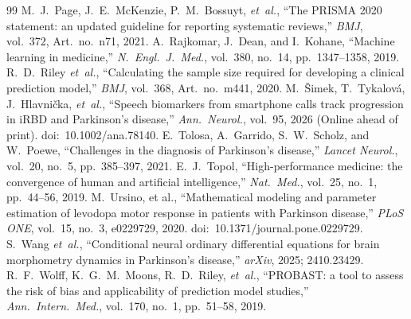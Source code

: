 \begin{thebibliography}{99}
M.~J.~Page, J.~E.~McKenzie, P.~M.~Bossuyt, \textit{et~al.}, ``The PRISMA 2020 statement: an updated guideline for reporting systematic reviews,'' \textit{BMJ}, vol.~372, Art.\ no.~n71, 2021.
A.~Rajkomar, J.~Dean, and I.~Kohane, ``Machine learning in medicine,'' \textit{N.\ Engl.\ J.\ Med.}, vol.~380, no.~14, pp.~1347--1358, 2019.
R.~D.~Riley \textit{et~al.}, ``Calculating the sample size required for developing a clinical prediction model,'' \textit{BMJ}, vol.~368, Art.\ no.~m441, 2020.
M.~Šimek, T.~Tykalová, J.~Hlavnička, \textit{et~al.}, ``Speech biomarkers from smartphone calls track progression in iRBD and Parkinson's disease,'' \textit{Ann.\ Neurol.}, vol.~95, 2026 (Online ahead of print). doi:~10.1002/ana.78140.
E.~Tolosa, A.~Garrido, S.~W.~Scholz, and W.~Poewe, ``Challenges in the diagnosis of Parkinson's disease,'' \textit{Lancet Neurol.}, vol.~20, no.~5, pp.~385--397, 2021.
E.~J.~Topol, ``High-performance medicine: the convergence of human and artificial intelligence,'' \textit{Nat.\ Med.}, vol.~25, no.~1, pp.~44--56, 2019.
M.~Ursino, et al., ``Mathematical modeling and parameter estimation of levodopa motor response in patients with Parkinson disease,'' \textit{PLoS ONE}, vol.~15, no.~3, e0229729, 2020. doi:~10.1371/journal.pone.0229729.
S.~Wang \textit{et~al.}, ``Conditional neural ordinary differential equations for brain morphometry dynamics in Parkinson's disease,'' \textit{arXiv}, 2025; 2410.23429.
R.~F.~Wolff, K.~G.~M.~Moons, R.~D.~Riley, \textit{et~al.}, ``PROBAST: a tool to assess the risk of bias and applicability of prediction model studies,'' \textit{Ann.\ Intern.\ Med.}, vol.~170, no.~1, pp.~51--58, 2019.

\end{thebibliography}
